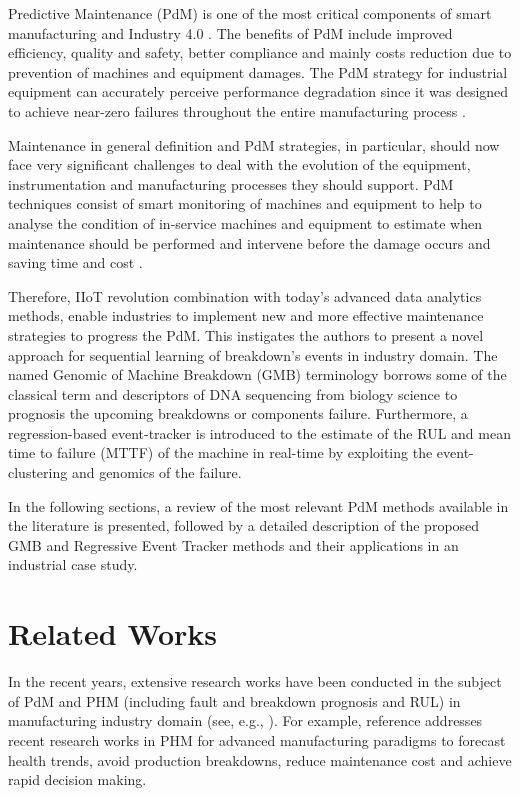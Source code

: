 \documentclass[conference]{IEEEtran}
\begin{document}
Predictive Maintenance (PdM) is one of the most critical components of smart manufacturing and Industry 4.0 \cite{Calabrese2019}.  The beneﬁts of PdM include improved efficiency, quality and safety, better compliance and mainly costs reduction due to prevention of machines and equipment damages. The PdM strategy for industrial equipment can accurately perceive performance degradation since it was designed to achieve near-zero failures throughout the entire manufacturing process \cite{Zhang2019}.  

Maintenance in general definition and PdM strategies, in particular, should now face very significant challenges to deal with the evolution of the equipment, instrumentation and manufacturing processes they should support. PdM techniques consist of smart monitoring of machines and equipment to help to analyse the condition of in-service machines and equipment to estimate when maintenance should be performed and intervene before the damage occurs and saving time and cost \cite{Calabrese2019}.

Therefore, IIoT revolution combination with today’s advanced data analytics methods, enable industries to implement new and more eﬀective maintenance strategies to progress the PdM. This instigates the authors to present a novel approach for sequential learning of breakdown’s events in industry domain. The named Genomic of Machine Breakdown (GMB) terminology borrows some of the classical term and descriptors of DNA sequencing from biology science to prognosis the upcoming breakdowns or components failure. Furthermore, a regression-based event-tracker is introduced to the estimate of the RUL and mean time to failure (MTTF) of the machine in real-time by exploiting the event-clustering and genomics of the failure. 

In the following sections, a review of the most relevant PdM methods available in the literature is presented, followed by a detailed description of the proposed GMB and Regressive Event Tracker methods and their applications in an industrial case study.


\section{Related Works}
\label{sec:Related_works}
In the recent years, extensive research works have been conducted in the subject of PdM and PHM (including fault and breakdown prognosis and RUL) in manufacturing industry domain (see, e.g., \cite{Guo2017,Kordestani2019,Razavi-Far2019a,Razavi-Far2019b,Razavi-Far2019c,Nguyen2019}). For example, reference \cite{Xia2018} addresses recent research works in PHM for advanced manufacturing paradigms to forecast health trends, avoid production breakdowns, reduce maintenance cost and achieve rapid decision making.
\end{document}
